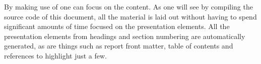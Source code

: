 By making use of \latex one can focus on the content. As one will see by compiling the source code of this document, all the material is laid out without having to spend significant amounts of time focused on the presentation elements. All the presentation elements from headings and section numbering are automatically generated, as are things such as report front matter, table of contents and references to highlight just a few.
